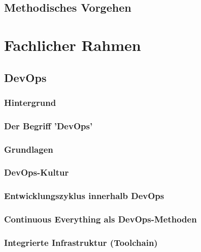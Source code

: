 \documentclass[12pt,titlepage]{report}
\begin{document}
\section{Methodisches Vorgehen}


\chapter{Fachlicher Rahmen}


\section{DevOps}


\subsection{Hintergrund}


\subsection{Der Begriff 'DevOps'}


\subsection{Grundlagen}


\subsection{DevOps-Kultur}


\subsection{Entwicklungszyklus innerhalb DevOps}


\subsection{Continuous Everything als DevOps-Methoden}


\subsection{Integrierte Infrastruktur (Toolchain)}

\end{document}
